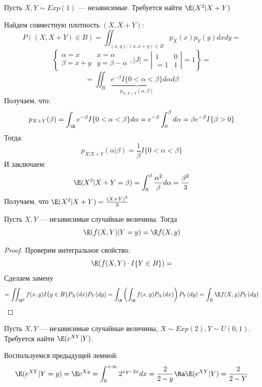 \begin{problem}
    Пусть \(X, Y \sim Exp(1)\) --- независимые. Требуется найти \(\E(X^2|X + Y)\)
\end{problem}
\begin{solution}
    Найдем совместную плотность \((X, X + Y)\):
    \[P((X, X + Y) \in B) = \iint_{(x, y): (x, x + y) \in B} p_X(x)p_Y(y)dxdy = \]
    \[\left\{\begin{array}{cc}
        \alpha = x & x = \alpha \\
        \beta = x + y & y = \beta - \alpha
    \end{array}, |J| = \left| \begin{array}{cc}
        1 & 0 \\
        =1 & 1
    \end{array} \right| = 1\right\} = \]
    \[= \iint_{B} \underbrace{e^{-\beta}I\{0 < \alpha < \beta\}}_{p_{X, X + Y}(\alpha, \beta)}d\alpha d\beta\]
    Получаем, что:
    \[p_{X + Y}(\beta) = \int_\R e^{-\beta}I\{0 < \alpha < \beta\} d\alpha = e^{-\beta} \int_0^\beta d\alpha = \beta e^{-\beta} I\{\beta > 0\}\]
    Тогда:
    \[p_{X|X + Y}(\alpha|\beta) = \frac{1}{\beta}I\{0 < \alpha < \beta\}\]
    И заключаем:
    \[\E(X^2 | X + Y = \beta) = \int_0^\beta \frac{\alpha^2}{\beta} d\alpha = \frac{\beta^2}{3}\]
    Получаем, что \(\E(X^2 | X + Y) = \frac{(X + Y)^2}{3}\)
\end{solution}

\begin{lemma}
    Пусть \(X, Y\) --- независимые случайные величины. Тогда 
    \[\E(f(X, Y)|Y = y) = \E f(X, y)\]
\end{lemma}
\begin{proof}
    Проверим интегральное свойство:
    \[\E(f(X, Y) \cdot I \{Y \in B\}) = \]
    Сделаем замену 
    \[= \iint_{\R^2} f(x, y)I\{y \in B\}P_X(dx) P_Y(dy) = \int_\R \left( \int_\R f(x, y) P_X(dx) \right) P_Y(dy) = \int_B \E f(X, y) P_Y(dy)\]
\end{proof}

\begin{problem}
    Пусть \(X, Y\) --- независимые случайные величины, \(X \sim Exp(2), Y \sim U(0, 1)\). Требуется найти \(\E(e^{XY}|Y)\).
\end{problem}
\begin{solution}
    Воспользуемся предыдущей леммой:
    \[\E(e^{XY} | Y = y) = \E e^{Xy} = \int_0^{+\infty} 2^{xy - 2x} dx = 
    \frac{2}{2 - y} \Ra \E(e^{XY} | Y) = \frac{2}{2 - Y}\]
\end{solution}

